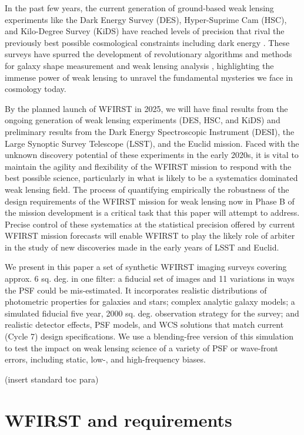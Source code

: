\documentclass[aps,prd, amsmath,amssymb,superscriptaddress,showkeys,nofootinbib,reprint,preprintnumbers]{revtex4-1}
\begin{document}
In the past few years, the current generation of ground-based weak lensing experiments like the Dark Energy Survey (DES), Hyper-Suprime Cam (HSC), and Kilo-Degree Survey (KiDS) have reached levels of precision that rival the previously best possible cosmological constraints including dark energy \cite{}. 
These surveys have spurred the development of revolutionary algorithms and methods for galaxy shape measurement and weak lensing analysis \cite{}, highlighting the immense power of weak lensing to unravel the fundamental mysteries we face in cosmology today. 

By the planned launch of WFIRST in 2025, we will have final results from the ongoing generation of weak lensing experiments (DES, HSC, and KiDS) and preliminary results from the Dark Energy Spectroscopic Instrument (DESI), the Large Synoptic Survey Telescope (LSST), and the Euclid mission. 
Faced with the unknown discovery potential of these experiments in the early 2020s, it is vital to maintain the agility and flexibility of the WFIRST mission to respond with the best possible science, particularly in what is likely to be a systematics dominated weak lensing field.
The process of quantifying empirically the robustness of the design requirements of the WFIRST mission for weak lensing now in Phase B of the mission development is a critical task that this paper will attempt to address. 
Precise control of these systematics at the statistical precision offered by current WFIRST mission forecasts will enable WFIRST to play the likely role of arbiter in the study of new discoveries made in the early years of LSST and Euclid.

We present in this paper a set of synthetic WFIRST imaging surveys covering approx. 6 sq. deg. in one filter: a fiducial set of images and 11 variations in ways the PSF could be mis-estimated. 
It incorporates realistic distributions of photometric properties for galaxies and stars; complex analytic galaxy models; a simulated fiducial five year, 2000 sq. deg. observation strategy for the survey; and realistic detector effects, PSF models, and WCS solutions that match current (Cycle 7) design specifications. 
We use a blending-free version of this simulation to test the impact on weak lensing science of a variety of PSF or wave-front errors, including static, low-, and high-frequency biases. 

(insert standard toc para) 


\section{WFIRST and requirements}\label{sec:wfirst}
\end{document}
